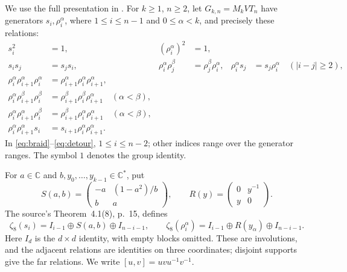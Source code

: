 \documentclass[11pt]{article}
\newcommand{\C}{\mathbb C}
\begin{document}
We use the full presentation in \cite[Section~3, (11)--(19), p.~6]{KMPN}.
For $k\ge1$, $n\ge2$, let $G_{k,n}=M_kVT_n$ have generators
$s_i,\rho_i^\alpha$, where $1\le i\le n-1$ and $0\le\alpha<k$,
and precisely these relations:
\begin{align}
 s_i^2&=1,&(\rho_i^\alpha)^2&=1,\label{eq:squares}\\
 s_is_j&=s_js_i,&\rho_i^\alpha\rho_j^\beta&=\rho_j^\beta\rho_i^\alpha,
 &\rho_i^\alpha s_j&=s_j\rho_i^\alpha\quad(|i-j|\ge2),\label{eq:far}\\
 \rho_i^\alpha\rho_{i+1}^\alpha\rho_i^\alpha
 &=\rho_{i+1}^\alpha\rho_i^\alpha\rho_{i+1}^\alpha,\label{eq:braid}\\
 \rho_i^\alpha\rho_{i+1}^\beta\rho_i^\beta
 &=\rho_{i+1}^\beta\rho_i^\beta\rho_{i+1}^\alpha\quad(\alpha<\beta),\label{eq:mixed1}\\
 \rho_i^\alpha\rho_{i+1}^\alpha\rho_i^\beta
 &=\rho_{i+1}^\beta\rho_i^\alpha\rho_{i+1}^\alpha\quad(\alpha<\beta),\label{eq:mixed2}\\
 \rho_i^\alpha\rho_{i+1}^\alpha s_i
 &=s_{i+1}\rho_i^\alpha\rho_{i+1}^\alpha.\label{eq:detour}
\end{align}
In \eqref{eq:braid}--\eqref{eq:detour}, $1\le i\le n-2$; other indices
range over the generator ranges. The symbol $1$ denotes the group identity.

For $a\in\C$ and $b,y_0,\ldots,y_{k-1}\in\C^*$, put
\[
 S(a,b)=\begin{pmatrix}-a&(1-a^2)/b\\b&a\end{pmatrix},\qquad
 R(y)=\begin{pmatrix}0&y^{-1}\\y&0\end{pmatrix}.
\]
The source's Theorem~4.1(8), p.~15, defines
\[
 \zeta_8(s_i)=I_{i-1}\oplus S(a,b)\oplus I_{n-i-1},\qquad
 \zeta_8(\rho_i^\alpha)=I_{i-1}\oplus R(y_\alpha)\oplus I_{n-i-1}.
\]
Here $I_d$ is the $d\times d$ identity, with empty blocks omitted.
These are involutions, and the adjacent relations are identities on
three coordinates; disjoint supports give the far relations.
We write $[u,v]=uvu^{-1}v^{-1}$.
\end{document}
